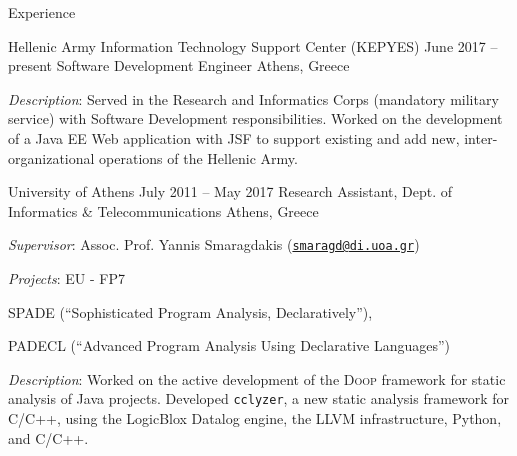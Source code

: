 \documentclass{resume}
\begin{document}
\begin{rSection}{Experience}

\begin{rSubsection}
  {Hellenic Army Information Technology Support Center (KEPYES)}
  {June 2017 -- present}
  {Software Development Engineer}
  {Athens, Greece}
\item \emph{Description}: Served in the Research and Informatics Corps
  (mandatory military service) with Software Development
  responsibilities. Worked on the development of a Java EE Web
  application with JSF to support existing and add new,
  inter-organizational operations of the Hellenic Army.
\end{rSubsection}


\begin{rSubsection}
  {University of Athens}
  {July 2011 -- May 2017}
  {Research Assistant, Dept. of Informatics \& Telecommunications}
  {Athens, Greece}
\item \emph{Supervisor}: Assoc. Prof. Yannis Smaragdakis
  (\href{mailto:smaragd@di.uoa.gr}{\nolinkurl{smaragd@di.uoa.gr}})
\item \emph{Projects}: EU - FP7
  \begin{inparaenum}[(1)]
  \item SPADE (``Sophisticated Program Analysis, Declaratively''), 
  \item PADECL (``Advanced Program Analysis Using Declarative
    Languages'')
  \end{inparaenum}
\item \emph{Description}: Worked on the active development of the
  \textsc{Doop} framework for static analysis of Java
  projects. Developed \texttt{cclyzer}, a new static analysis
  framework for C/C++, using the LogicBlox Datalog engine, the LLVM
  infrastructure, Python, and C/C++.
\end{rSubsection}



\end{rSection}
\end{document}
